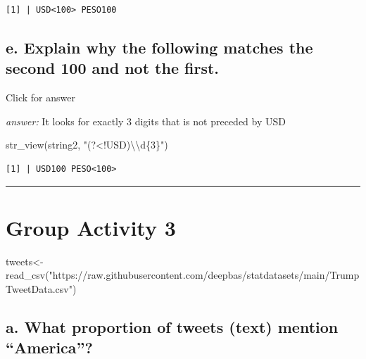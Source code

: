 \documentclass[
]{book}
\newenvironment{Shaded}{\begin{snugshade}}{\end{snugshade}}
\newcommand{\FunctionTok}[1]{\textcolor[rgb]{0.00,0.00,0.00}{#1}}
\newcommand{\NormalTok}[1]{#1}
\newcommand{\OtherTok}[1]{\textcolor[rgb]{0.56,0.35,0.01}{#1}}
\newcommand{\SpecialCharTok}[1]{\textcolor[rgb]{0.00,0.00,0.00}{#1}}
\newcommand{\StringTok}[1]{\textcolor[rgb]{0.31,0.60,0.02}{#1}}
\begin{document}
\begin{verbatim}
[1] | USD<100> PESO100
\end{verbatim}

\hypertarget{e.-explain-why-the-following-matches-the-second-100-and-not-the-first.}{%
\subsection{e. Explain why the following matches the second 100 and not the first.}\label{e.-explain-why-the-following-matches-the-second-100-and-not-the-first.}}

Click for answer

\emph{answer:} It looks for exactly 3 digits that is not preceded by USD

\begin{Shaded}
\begin{Highlighting}[]
\FunctionTok{str\_view}\NormalTok{(string2, }\StringTok{"(?\textless{}!USD)}\SpecialCharTok{\textbackslash{}\textbackslash{}}\StringTok{d\{3\}"}\NormalTok{)}
\end{Highlighting}
\end{Shaded}

\begin{verbatim}
[1] | USD100 PESO<100>
\end{verbatim}

\begin{center}\rule{0.5\linewidth}{0.5pt}\end{center}

\hypertarget{group-activity-3}{%
\section{Group Activity 3}\label{group-activity-3}}

\begin{Shaded}
\begin{Highlighting}[]
\NormalTok{tweets}\OtherTok{\textless{}{-}} \FunctionTok{read\_csv}\NormalTok{(}\StringTok{"https://raw.githubusercontent.com/deepbas/statdatasets/main/TrumpTweetData.csv"}\NormalTok{)}
\end{Highlighting}
\end{Shaded}

\hypertarget{a.-what-proportion-of-tweets-text-mention-america}{%
\subsection{a. What proportion of tweets (text) mention ``America''?}\label{a.-what-proportion-of-tweets-text-mention-america}}
\end{document}
